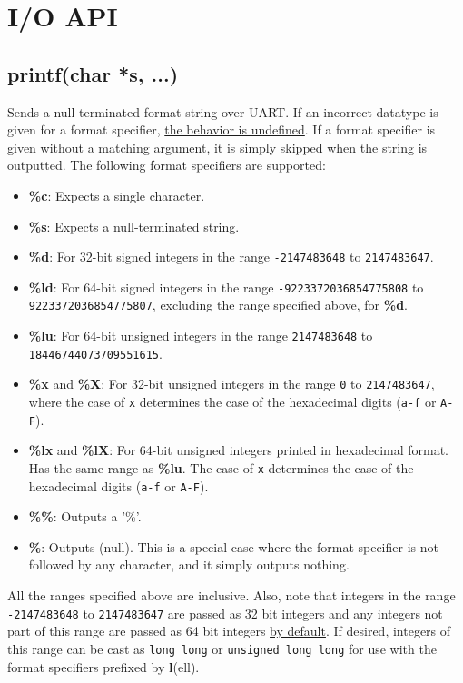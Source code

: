 \newpage
\chapter{I/O API}
\section{printf(char *s, ...)}
Sends a null-terminated format string over UART. If an incorrect datatype is given 
for a format specifier, \underline{the behavior is undefined}. If a format specifier 
is given without a matching argument, it is simply skipped when the string is outputted. 
The following format specifiers are supported:

\begin{itemize}
  \item \textbf{\%c}: Expects a single character.
  \item \textbf{\%s}: Expects a null-terminated string.
  \item \textbf{\%d}: For 32-bit signed integers in the range \texttt{-2147483648} to \texttt{2147483647}.
  \item \textbf{\%ld}: For 64-bit signed integers in the range \texttt{-9223372036854775808} to \texttt{9223372036854775807}, excluding the range specified above, for \textbf{\%d}.
  \item \textbf{\%lu}: For 64-bit unsigned integers in the range \texttt{2147483648} to \texttt{18446744073709551615}.
  \item \textbf{\%x} and \textbf{\%X}: For 32-bit unsigned integers in the range \texttt{0} to \texttt{2147483647}, where the case of \texttt{x} determines the case of the hexadecimal digits (\texttt{a-f} or \texttt{A-F}).
  \item \textbf{\%lx} and \textbf{\%lX}: For 64-bit unsigned integers printed in hexadecimal format. Has the same range as \textbf{\%lu}. The case of \texttt{x} determines the case of the hexadecimal digits (\texttt{a-f} or \texttt{A-F}).
  \item \textbf{\%\%}: Outputs a '\%'.
  \item \textbf{\%}: Outputs (null). This is a special case where the format specifier is not followed by any character, and it simply outputs nothing.
\end{itemize}

\begin{flushleft}
All the ranges specified above are inclusive. Also, note that integers in the 
range \texttt{-2147483648} to \texttt{2147483647} are passed as 32 bit integers 
and any integers not part of this range are passed as 64 bit integers \underline{by default}.
If desired, integers of this range can be cast as \texttt{long long} or \texttt{unsigned long long} 
for use with the format specifiers prefixed by \textbf{l}(ell).
\end{flushleft}

